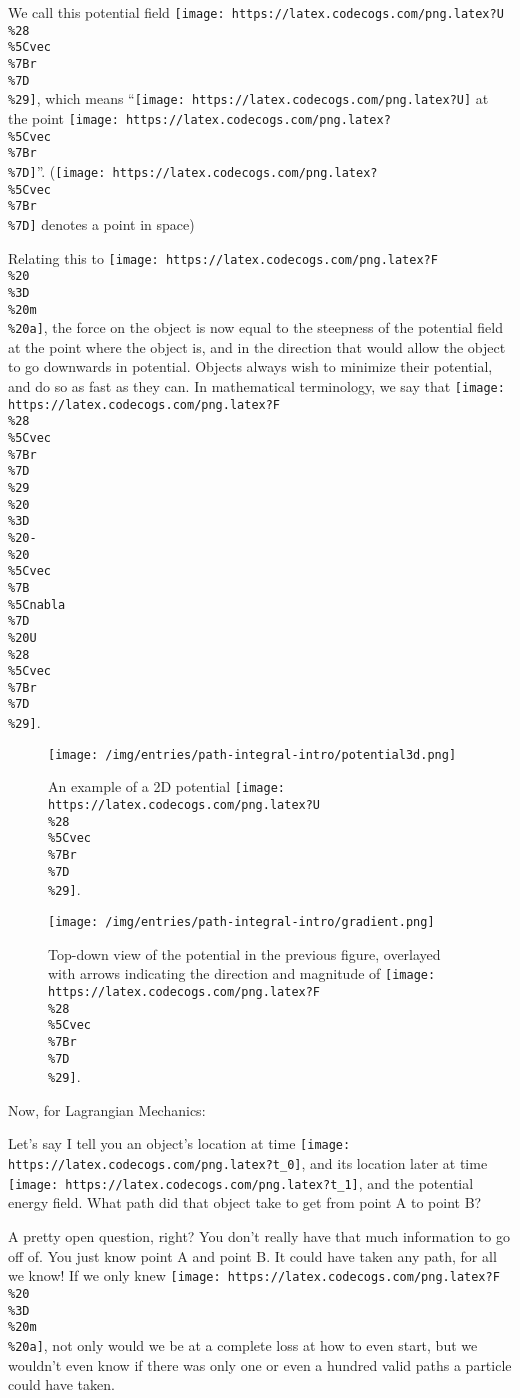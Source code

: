 \documentclass[]{article}
\begin{document}
We call this potential field
\texttt{[image: https://latex.codecogs.com/png.latex?U\\\%28\\\%5Cvec\\\%7Br\\\%7D\\\%29]},
which means ``\texttt{[image: https://latex.codecogs.com/png.latex?U]} at the
point \texttt{[image: https://latex.codecogs.com/png.latex?\\\%5Cvec\\\%7Br\\\%7D]}''.
(\texttt{[image: https://latex.codecogs.com/png.latex?\\\%5Cvec\\\%7Br\\\%7D]} denotes
a point in space)

Relating this to
\texttt{[image: https://latex.codecogs.com/png.latex?F\\\%20\\\%3D\\\%20m\\\%20a]}, the
force on the object is now equal to the steepness of the potential field at the
point where the object is, and in the direction that would allow the object to
go downwards in potential. Objects always wish to minimize their potential, and
do so as fast as they can. In mathematical terminology, we say that
\texttt{[image: https://latex.codecogs.com/png.latex?F\\\%28\\\%5Cvec\\\%7Br\\\%7D\\\%29\\\%20\\\%3D\\\%20-\\\%20\\\%5Cvec\\\%7B\\\%5Cnabla\\\%7D\\\%20U\\\%28\\\%5Cvec\\\%7Br\\\%7D\\\%29]}.

\begin{figure}
\centering
\texttt{[image: /img/entries/path-integral-intro/potential3d.png]}
\caption{An example of a 2D potential
\texttt{[image: https://latex.codecogs.com/png.latex?U\\\%28\\\%5Cvec\\\%7Br\\\%7D\\\%29]}.}
\end{figure}

\begin{figure}
\centering
\texttt{[image: /img/entries/path-integral-intro/gradient.png]}
\caption{Top-down view of the potential in the previous figure, overlayed with
arrows indicating the direction and magnitude of
\texttt{[image: https://latex.codecogs.com/png.latex?F\\\%28\\\%5Cvec\\\%7Br\\\%7D\\\%29]}.}
\end{figure}

Now, for Lagrangian Mechanics:

Let's say I tell you an object's location at time
\texttt{[image: https://latex.codecogs.com/png.latex?t\_0]}, and its location
later at time \texttt{[image: https://latex.codecogs.com/png.latex?t\_1]}, and
the potential energy field. What path did that object take to get from point A
to point B?

A pretty open question, right? You don't really have that much information to go
off of. You just know point A and point B. It could have taken any path, for all
we know! If we only knew
\texttt{[image: https://latex.codecogs.com/png.latex?F\\\%20\\\%3D\\\%20m\\\%20a]}, not
only would we be at a complete loss at how to even start, but we wouldn't even
know if there was only one or even a hundred valid paths a particle could have
taken.
\end{document}
